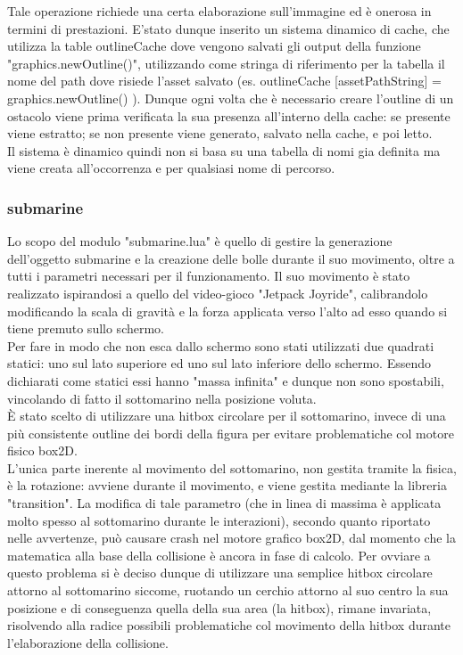 \documentclass[15pt]{article}
\begin{document}
Tale operazione richiede una certa elaborazione sull’immagine ed è onerosa in termini di prestazioni. E'stato dunque inserito un sistema 
dinamico di cache, che utilizza la table outlineCache dove vengono salvati gli output della funzione "graphics.newOutline()", utilizzando come stringa di riferimento per la tabella il nome del path dove risiede l’asset salvato (es. outlineCache [assetPathString] = graphics.newOutline() ).
Dunque ogni volta che è necessario creare l’outline di un ostacolo viene prima verificata la sua presenza all'interno della cache: se presente viene
estratto; se non presente viene generato, salvato nella cache, e poi letto.
\\

Il sistema è dinamico quindi non si basa 
su una tabella di nomi gia definita ma viene creata all’occorrenza e per qualsiasi nome di percorso.

\subsubsection{submarine}
Lo scopo del modulo "submarine.lua" è quello di gestire la generazione dell'oggetto submarine e la creazione delle bolle durante il suo movimento, oltre a tutti i parametri necessari per il funzionamento.
Il suo movimento è stato realizzato ispirandosi a quello del video-gioco "Jetpack Joyride", calibrandolo modificando la scala di gravità e la forza applicata verso l'alto ad esso quando si tiene premuto sullo schermo.\\

Per fare in modo che non esca dallo schermo sono stati utilizzati due quadrati statici: uno sul lato superiore ed uno sul lato inferiore dello schermo. Essendo dichiarati come statici essi hanno "massa infinita" e dunque non sono spostabili, vincolando di fatto il sottomarino nella posizione voluta.\\

È stato scelto di utilizzare una hitbox circolare per il sottomarino, invece di una più consistente outline dei bordi della figura per evitare problematiche col motore fisico box2D.
\\
L’unica parte inerente al movimento del sottomarino, non gestita tramite la fisica, è la rotazione: avviene durante il movimento, e viene gestita mediante la libreria "transition". La modifica di tale parametro (che in linea di massima è applicata molto spesso al sottomarino durante le interazioni), secondo quanto riportato nelle avvertenze, può causare crash nel motore grafico box2D, dal momento che la matematica alla base della collisione è ancora in fase di calcolo. Per ovviare a questo problema si è deciso dunque di utilizzare una semplice hitbox circolare attorno al sottomarino siccome, ruotando un cerchio attorno al suo centro la sua posizione e di conseguenza quella della sua area (la hitbox), rimane invariata, risolvendo alla radice possibili problematiche col movimento della hitbox durante l’elaborazione della collisione.
\end{document}
